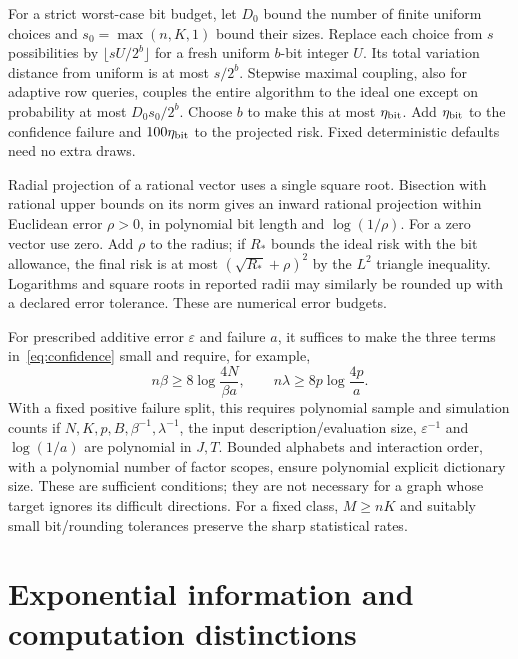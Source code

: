 \documentclass[11pt,a4paper]{article}
\numberwithin{equation}{section}
\theoremstyle{definition}
\begin{document}
For a strict worst-case bit budget, let $D_0$ bound the number of finite
uniform choices and $s_0=\max(n,K,1)$ bound their sizes. Replace each
choice from $s$ possibilities by $\lfloor sU/2^b\rfloor$ for a fresh
uniform $b$-bit integer $U$. Its total variation distance from uniform
is at most $s/2^b$. Stepwise maximal coupling, also for adaptive row
queries, couples the entire algorithm to the ideal one except on
probability at most $D_0s_0/2^b$. Choose $b$ to make this at most
$\eta_{\rm bit}$. Add $\eta_{\rm bit}$ to the confidence failure and
$100\eta_{\rm bit}$ to the projected risk. Fixed deterministic defaults
need no extra draws.

Radial projection of a rational vector uses a single square root. Bisection
with rational upper bounds on its norm gives an inward rational projection
within Euclidean error $\rho>0$, in polynomial bit length and
$\log(1/\rho)$. For a zero vector use zero. Add $\rho$ to the radius;
if $R_*$ bounds the ideal risk with the bit allowance, the final risk is
at most $(\sqrt{R_*}+\rho)^2$ by the $L^2$ triangle inequality.
Logarithms and square roots in reported radii may similarly be rounded
up with a declared error tolerance. These are numerical error budgets.

For prescribed additive error $\varepsilon$ and failure $a$, it suffices
to make the three terms in~\eqref{eq:confidence} small and require, for
example,
\[
 n\beta\ge8\log\frac{4N}{\beta a},\qquad
 n\lambda\ge8p\log\frac{4p}{a}.
\]
With a fixed positive failure split, this requires polynomial sample and
simulation counts if $N,K,p,B,\beta^{-1},\lambda^{-1}$, the input
description/evaluation size, $\varepsilon^{-1}$ and $\log(1/a)$ are
polynomial in $J,T$. Bounded alphabets and interaction order, with a
polynomial number of factor scopes, ensure polynomial explicit
dictionary size. These are sufficient conditions; they are not necessary
for a graph whose target ignores its difficult directions. For a fixed
class, $M\ge nK$ and suitably small bit/rounding tolerances preserve the
sharp statistical rates.

\section{Exponential information and computation distinctions}\label{sec:exponential}
\end{document}
